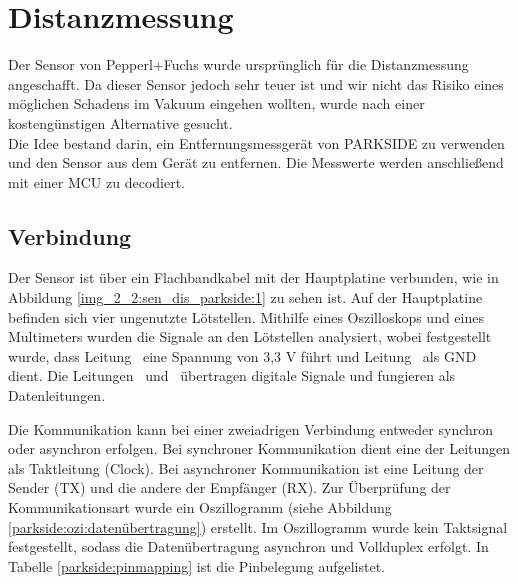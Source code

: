 \section{Distanzmessung}
\label{Distanzmessung}
%
%
%
Der Sensor von Pepperl+Fuchs wurde ursprünglich für die Distanzmessung angeschafft. Da dieser Sensor jedoch sehr teuer ist und wir nicht das Risiko eines möglichen Schadens im Vakuum eingehen wollten, wurde nach einer kostengünstigen Alternative gesucht.\\
Die Idee bestand darin, ein Entfernungsmessgerät von PARKSIDE zu verwenden und den Sensor aus dem Gerät zu entfernen. Die Messwerte werden anschließend mit einer MCU zu decodiert.

\subsection{Verbindung}

Der Sensor ist über ein Flachbandkabel mit der Hauptplatine verbunden, wie in Abbildung \ref{img_2_2:sen_dis_parkside:1} zu sehen ist. Auf der Hauptplatine befinden sich vier ungenutzte Lötstellen. Mithilfe eines Oszilloskops und eines Multimeters wurden die Signale an den Lötstellen analysiert, wobei festgestellt wurde, dass Leitung \flqq\ eine Spannung von 3,3 V führt und Leitung \flqq\ als GND dient. Die Leitungen \flqq\ und \flqq\ übertragen digitale Signale und fungieren als Datenleitungen.

Die Kommunikation kann bei einer zweiadrigen Verbindung entweder synchron oder asynchron erfolgen. Bei synchroner Kommunikation dient eine der Leitungen als Taktleitung (Clock). Bei asynchroner Kommunikation ist eine Leitung der Sender (TX) und die andere der Empfänger (RX). Zur Überprüfung der Kommunikationsart wurde ein Oszillogramm (siehe Abbildung \ref{parkside:ozi:datenübertragung}) erstellt. Im Oszillogramm wurde kein Taktsignal festgestellt, sodass die Datenübertragung asynchron und Vollduplex erfolgt. In Tabelle \ref{parkside:pinmapping} ist die Pinbelegung aufgelistet.\\



